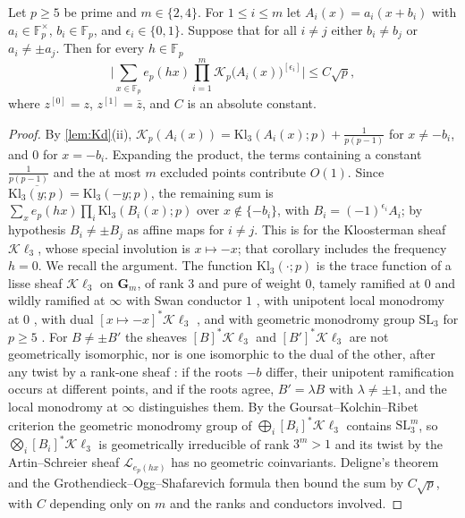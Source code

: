 \documentclass[11pt,colorlinks]{charlie}
\newcommand{\F}{\mathbb{F}}
\begin{document}
\begin{lemma}[Correlations]\label{lem:corr}
Let $p\ge5$ be prime and $m\in\{2,4\}$. For $1\le i\le m$ let $A_i(x)=a_i(x+b_i)$ with $a_i\in\F_p^\times$, $b_i\in\F_p$, and $\epsilon_i\in\{0,1\}$. Suppose that for all $i\ne j$ either $b_i\ne b_j$ or $a_i\ne\pm a_j$. Then for every $h\in\F_p$
\[
 \Big|\sum_{x\in\F_p}e_p(hx)\prod_{i=1}^m\mathscr K_p\big(A_i(x)\big)^{[\epsilon_i]}\Big|\le C\sqrt p,
\]
where $z^{[0]}=z$, $z^{[1]}=\bar z$, and $C$ is an absolute constant.
\end{lemma}
\begin{proof}
By \cref{lem:Kd}(ii), $\mathscr K_p(A_i(x))=\mathrm{Kl}_3(A_i(x);p)+\frac1{p(p-1)}$ for $x\ne-b_i$, and $0$ for $x=-b_i$. Expanding the product, the terms containing a constant $\frac1{p(p-1)}$ and the at most $m$ excluded points contribute $O(1)$. Since $\overline{\mathrm{Kl}_3(y;p)}=\mathrm{Kl}_3(-y;p)$, the remaining sum is $\sum_xe_p(hx)\prod_i\mathrm{Kl}_3(B_i(x);p)$ over $x\notin\{-b_i\}$, with $B_i=(-1)^{\epsilon_i}A_i$; by hypothesis $B_i\ne\pm B_j$ as affine maps for $i\ne j$. This is \cite[Corollary~3.4]{FKM} for the Kloosterman sheaf $\mathcal{K}\ell_3$, whose special involution is $x\mapsto-x$; that corollary includes the frequency $h=0$. We recall the argument. The function $\mathrm{Kl}_3(\cdot;p)$ is the trace function of a lisse sheaf $\mathcal K\ell_3$ on $\mathbf G_m$, of rank $3$ and pure of weight $0$, tamely ramified at $0$ and wildly ramified at $\infty$ with Swan conductor $1$ \cite[4.1.1]{GKM}, with unipotent local monodromy at $0$ \cite[7.4.3]{GKM}, with dual $[x\mapsto-x]^*\mathcal K\ell_3$ \cite[4.1.3--4.1.4(2)]{GKM}, and with geometric monodromy group $\mathrm{SL}_3$ for $p\ge5$ \cite[11.1]{GKM}. For $B\ne\pm B'$ the sheaves $[B]^*\mathcal K\ell_3$ and $[B']^*\mathcal K\ell_3$ are not geometrically isomorphic, nor is one isomorphic to the dual of the other, after any twist by a rank-one sheaf \cite[\S3.3, Proposition~3.7(2)--(3)]{FKM}: if the roots $-b$ differ, their unipotent ramification occurs at different points, and if the roots agree, $B'=\lambda B$ with $\lambda\ne\pm1$, and the local monodromy at $\infty$ distinguishes them. By the Goursat--Kolchin--Ribet criterion \cite[1.8.2]{ESDE} the geometric monodromy group of $\bigoplus_i[B_i]^*\mathcal K\ell_3$ contains $\mathrm{SL}_3^m$, so $\bigotimes_i[B_i]^*\mathcal K\ell_3$ is geometrically irreducible of rank $3^m>1$ and its twist by the Artin--Schreier sheaf $\mathcal L_{e_p(hx)}$ has no geometric coinvariants. Deligne's theorem \cite{Deligne} and the Grothendieck--Ogg--Shafarevich formula then bound the sum by $C\sqrt p$, with $C$ depending only on $m$ and the ranks and conductors involved.
\end{proof}
\end{document}
